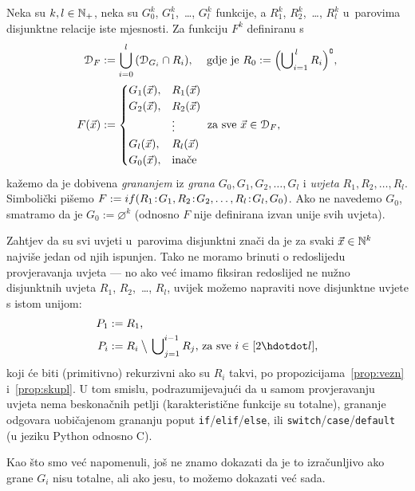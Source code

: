 \begin{definicija}[{name=[grananje]}]\label{def:gr}
Neka su $k,l\in{\mathbb N}_+$, neka su $G_0^k$, $G_1^k$,~\ldots, $G_l^k$ funkcije, a $R_1^k$, $R_2^k$,~\ldots, $R_l^k$ u~parovima disjunktne relacije iste mjesnosti. Za funkciju $F^k$ definiranu s
\begin{align}
	\label{eq:domgran}
    \mathcal D_{F}&:=\bigcup_{i=0}^l\,(\mathcal D_{G_i}\cap R_i)\text{, \quad gdje je }
    R_0:=\Bigl(\bigcup\nolimits_{i=1}^{\,l}R_i\Bigr)\sp{{\scriptscriptstyle\complement}}\text,\\
    F(\vec x)&:=\begin{cases}
    G_1(\vec x),&R_1(\vec x)\\
    G_2(\vec x),&R_2(\vec x)\\
    &\vdots\\
    G_l(\vec x),&R_l(\vec x)\\
    G_0(\vec x),&\text{inače}
    \end{cases}\text{ za sve $\vec x\in\mathcal D_{F}$,}
\end{align}
kažemo da je dobivena \emph{grananjem} iz \emph{grana} $G_0,G_1,G_2,\dotsc,G_l$ i \emph{uvjeta} $R_1,R_2,\dotsc,R_l$. Simbolički pišemo $F:=if(R_1\!:\!G_1,R_2\!:\!G_2,\dots,R_l\!:\!G_l,G_0)$. Ako ne navedemo $G_0$, smatramo da je $G_0:=\varnothing^k$ (odnosno $F$ nije definirana izvan unije svih uvjeta).
\end{definicija}

Zahtjev da su svi uvjeti u~parovima disjunktni znači da je za svaki $\vec x\in{\mathbb N}^k$ najviše jedan od njih ispunjen. Tako ne moramo brinuti o redoslijedu provjeravanja uvjeta --- no ako već imamo fiksiran redoslijed ne nužno disjunktnih uvjeta $R_1$, $R_2$,~\ldots, $R_l$, uvijek možemo napraviti nove disjunktne uvjete s istom unijom:
\begin{align}
    P_1&:=R_1\text,\\
    P_i&:=R_i\mathbin{\big\backslash}\,\bigcup\nolimits_{j=1}^{i-1}R_j\text{, za sve $i\in[2\dd l]$,}
\end{align}
koji će biti (primitivno) rekurzivni ako su $R_i$ takvi, po propozicijama~\ref{prop:vezn} i~\ref{prop:skupl}. U tom smislu, podrazumijevajući da u samom provjeravanju uvjeta nema beskonačnih petlji (karakteristične funkcije su totalne), grananje odgovara uobičajenom grananju poput \texttt{if}/\texttt{elif}/\texttt{else}, ili \texttt{switch}/\texttt{case}/\texttt{default} (u jeziku Python odnosno C).

Kao što smo već napomenuli, još ne znamo dokazati da je to izračunljivo ako grane $G_i$ nisu totalne, ali ako jesu, to možemo dokazati već sada.

